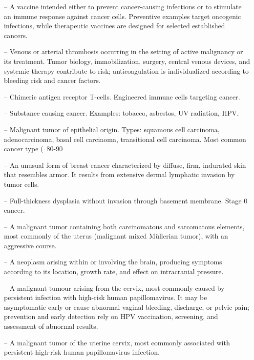 -- A vaccine intended either to prevent cancer-causing infections or to stimulate an immune response against cancer cells. Preventive examples target oncogenic infections, while therapeutic vaccines are designed for selected established cancers.

-- Venous or arterial thrombosis occurring in the setting of active malignancy or its treatment. Tumor biology, immobilization, surgery, central venous devices, and systemic therapy contribute to risk; anticoagulation is individualized according to bleeding risk and cancer factors.

-- Chimeric antigen receptor T-cells. Engineered immune cells targeting cancer.

-- Substance causing cancer. Examples: tobacco, asbestos, UV radiation, HPV.

-- Malignant tumor of epithelial origin. Types: squamous cell carcinoma, adenocarcinoma, basal cell carcinoma, transitional cell carcinoma. Most common cancer type (~80-90%

-- An unusual form of breast cancer characterized by diffuse, firm, indurated skin that resembles armor. It results from extensive dermal lymphatic invasion by tumor cells.

-- Full-thickness dysplasia without invasion through basement membrane. Stage 0 cancer.

-- A malignant tumor containing both carcinomatous and sarcomatous elements, most commonly of the uterus (malignant mixed Müllerian tumor), with an aggressive course.

-- A neoplasm arising within or involving the brain, producing symptoms according to its location, growth rate, and effect on intracranial pressure.

-- A malignant tumour arising from the cervix, most commonly caused by persistent infection with high-risk human papillomavirus. It may be asymptomatic early or cause abnormal vaginal bleeding, discharge, or pelvic pain; prevention and early detection rely on HPV vaccination, screening, and assessment of abnormal results.

-- A malignant tumor of the uterine cervix, most commonly associated with persistent high-risk human papillomavirus infection.

